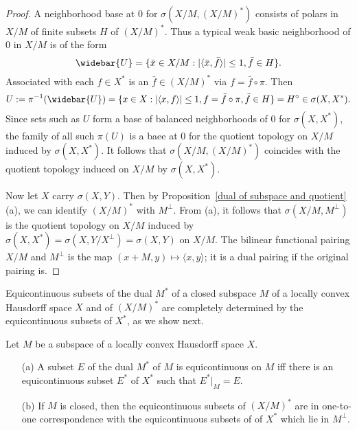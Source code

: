 \begin{proof}
A neighborhood base at $0$ for $\sigma(X/M,(X/M)^*)$ consists of polars in $X/M$ of finite subsets $H$ of $(X/M)^*$. Thus a typical weak basic neighborhood of $0$ in $X/M$ is of the form
\[\widebar{U}=\{\bar{x}\in X/M:|\langle\bar{x},\bar{f}\rangle|\leq 1,\bar{f}\in H\}.\]
Associated with each $f\in X^*$ is an $\bar{f}\in(X/M)^*$ via $f=\bar{f}\circ\pi$. Then
\[U:=\pi^{-1}(\widebar{U})=\{x\in X:|\langle x,f\rangle|\leq 1,f=\bar{f}\circ\pi,\bar{f}\in H\}=H^\circ\in\sigma(X,X^*).\]
Since sets such as $U$ form a base of balanced neighborhoods of $0$ for $\sigma(X,X^*)$, the family of all such $\pi(U)$ is a baee at $0$ for the quotient topology on $X/M$ induced by $\sigma(X,X^*)$. It follows that $\sigma(X/M,(X/M)^*)$ coincides with the quotient topology induced on $X/M$ by $\sigma(X,X^*)$.\par
Now let $X$ carry $\sigma(X,Y)$. Then by Proposition~\ref{dual of subspace and quotient}(a), we can identify $(X/M)^*$ with $M^\bot$. From (a), it follows that $\sigma(X/M,M^\bot)$ is the quotient topology on $X/M$ induced by $\sigma(X,X^*)=\sigma(X,Y/X^\bot)=\sigma(X,Y)$ on $X/M$. The bilinear functional pairing $X/M$ and $M^\bot$ is the map $(x+M,y)\mapsto\langle x,y\rangle$; it is a dual pairing if the original pairing is.
\end{proof}
Equicontinuous subsets of the dual $M^*$ of a closed subspace $M$ of a locally convex Hausdorff space $X$ and of $(X/M)^*$ are completely determined by the equicontinuous subsets of $X^*$, as we show next.
\begin{proposition}
Let $M$ be a subspace of a locally convex Hausdorff space $X$.
\begin{itemize}
\item[(a)] A subset $E$ of the dual $M^*$ of $M$ is equicontinuous on $M$ iff there is an equicontinuous subset $E^*$ of $X^*$ such that $E^*|_M=E$.
\item[(b)] If $M$ is closed, then the equicontinuous subsets of $(X/M)^*$ are in one-to-one correspondence with the equicontinuous subsets of of $X^*$ which lie in $M^\bot$.
\end{itemize}
\end{proposition}
